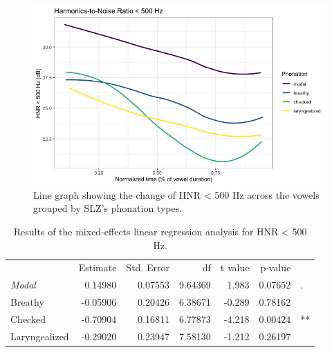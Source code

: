 \documentclass[12pt, letterpaper]{article}
\providecommand{\lsptoprule}{\midrule\toprule}
\providecommand{\lspbottomrule}{\bottomrule\midrule}
\begin{document}
\begin{figure}[!h]
	\centering
	\includegraphics[width=.75\linewidth]{Images/HNR05.png}
	\caption{Line graph showing the change of HNR < 500 Hz across the vowels grouped by SLZ's phonation types.}
	\label{fig:HNR05}
\end{figure}

\begin{table}[!h]
    \centering
    \caption{Results of the mixed-effects linear regression analysis for HNR < 500 Hz.}
    \label{tab:HNR05}
    \begin{tabular}{lrrrrrl}
	\lsptoprule
					&  Estimate  & Std. Error & df & t value & p-value & \\
        \textit{Modal}  &  0.14980  & 0.07553 & 9.64369 &  1.983 & 0.07652 & . \\  
  	Breathy   		&  -0.05906 & 0.20426 & 6.38671 & -0.289 & 0.78162 &  \\
	Checked    		&  -0.70904 & 0.16811 & 6.77873 & -4.218 & 0.00424 & ** \\
	Laryngealized	&  -0.29020 & 0.23947 & 7.58130 & -1.212 & 0.26197 & \\
    \lspbottomrule
    \end{tabular}
\end{table}

\end{document}
